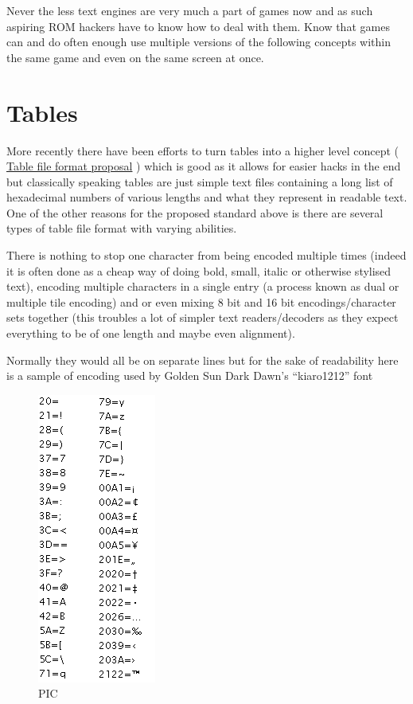 \documentclass[
]{book}
\begin{document}
Never the less text engines are very much a part of games now and as such aspiring ROM hackers have to know how to deal with them. Know that games can and do often enough use multiple versions of the following concepts within the same game and even on the same screen at once.

\hypertarget{tables}{%
\section{Tables}\label{tables}}

More recently there have been efforts to turn tables into a higher level concept ( \href{http://transcorp.parodius.com/scratchpad/Table\%20File\%20Format.txt}{Table file format proposal} ) which is good as it allows for easier hacks in the end but classically speaking tables are just simple text files containing a long list of hexadecimal numbers of various lengths and what they represent in readable text. One of the other reasons for the proposed standard above is there are several types of table file format with varying abilities.

There is nothing to stop one character from being encoded multiple times (indeed it is often done as a cheap way of doing bold, small, italic or otherwise stylised text), encoding multiple characters in a single entry (a process known as dual or multiple tile encoding) and or even mixing 8 bit and 16 bit encodings/character sets together (this troubles a lot of simpler text readers/decoders as they expect everything to be of one length and maybe even alignment).

Normally they would all be on separate lines but for the sake of readability here is a sample of encoding used by Golden Sun Dark Dawn's ``kiaro1212'' font

\begin{figure}
\centering
\includegraphics{images/79_home_fast6191_romhackingguide_unrenamed_files_and_original_borders_romhackingencodingdemo.png}
\caption{PIC}
\end{figure}
\end{document}
